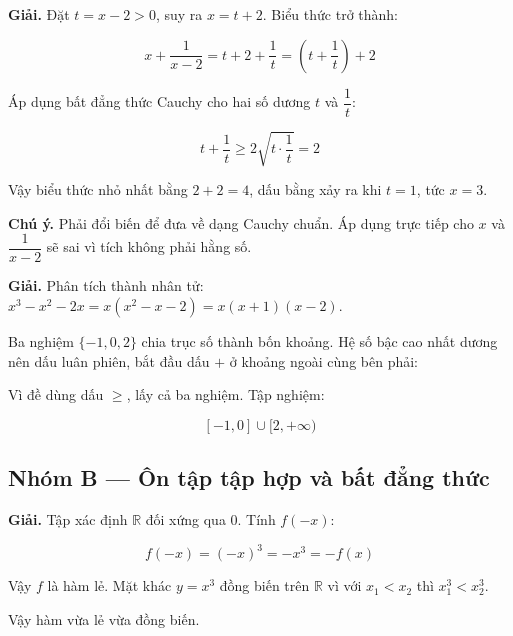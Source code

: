 \documentclass[11pt, a4paper]{article}
\begin{document}
\begin{dapan}[24 — Đáp án C]
\textbf{Giải.} Đặt $t = x - 2 > 0$, suy ra $x = t + 2$. Biểu thức trở thành:

$$x + \frac{1}{x-2} = t + 2 + \frac{1}{t} = \left(t + \frac{1}{t}\right) + 2$$

Áp dụng bất đẳng thức Cauchy cho hai số dương $t$ và $\dfrac{1}{t}$:

$$t + \frac{1}{t} \ge 2\sqrt{t \cdot \frac{1}{t}} = 2$$

Vậy biểu thức nhỏ nhất bằng $2 + 2 = 4$, dấu bằng xảy ra khi $t = 1$, tức $x = 3$.

\textbf{Chú ý.} Phải đổi biến để đưa về dạng Cauchy chuẩn. Áp dụng trực tiếp cho $x$ và $\dfrac{1}{x-2}$ sẽ sai vì tích không phải hằng số.
\end{dapan}

\begin{dapan}[25 — Đáp án A]
\textbf{Giải.} Phân tích thành nhân tử: $x^3 - x^2 - 2x = x(x^2 - x - 2) = x(x+1)(x-2)$.

Ba nghiệm $\{-1, 0, 2\}$ chia trục số thành bốn khoảng. Hệ số bậc cao nhất dương nên dấu luân phiên, bắt đầu dấu $+$ ở khoảng ngoài cùng bên phải:


Vì đề dùng dấu $\ge$, lấy cả ba nghiệm. Tập nghiệm:

$$[-1, 0] \cup [2, +\infty)$$
\end{dapan}

\subsection*{Nhóm B — Ôn tập tập hợp và bất đẳng thức}

\begin{dapan}[1 — Đáp án A]
\textbf{Giải.} Tập xác định $\mathbb{R}$ đối xứng qua $0$. Tính $f(-x)$:

$$f(-x) = (-x)^3 = -x^3 = -f(x)$$

Vậy $f$ là hàm lẻ. Mặt khác $y = x^3$ đồng biến trên $\mathbb{R}$ vì với $x_1 < x_2$ thì $x_1^3 < x_2^3$.

Vậy hàm vừa lẻ vừa đồng biến.
\end{dapan}
\end{document}
